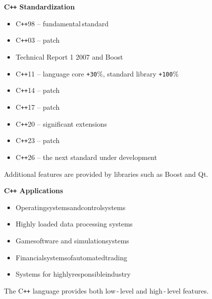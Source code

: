 \documentclass{beamer}
\begin{document}
\begin{frame}{\bf C\texttt{++} Standardization}

    \begin{itemize}

        \item C\texttt{++}98 -- fundamental\,standard

        \item C\texttt{++}03 -- patch

        \item Technical Report 1 2007 and Boost

        \item C\texttt{++}11 -- language core \texttt{+30}\%, standard library \texttt{+100}\%

        \item C\texttt{++}14 -- patch

        \item C\texttt{++}17 -- patch

        \item C\texttt{++}20 -- significant extensions

        \item C\texttt{++}23 -- patch

        \item C\texttt{++}26 -- the next standard under development
         
    \end{itemize}

    \begin{block}
    \justifying Additional features are provided by libraries such as Boost and Qt.
    \end{block}
    
\end{frame}

\begin{frame}{\bf C\texttt{++} Applications}
    
    \begin{itemize}

        \item Operating\:systems\;and\;control\:systems

        \item Highly loaded data processing systems

        \item Game\;software and simulation\;systems

        \item Financial\:systems\:of\:automated\:trading

        \item Systems for highly\;responsible\;industry
        
    \end{itemize}

    \begin{block}
    \justifying The C\texttt{++} language provides both low\,-\,level and high\,-\,level features.
    \end{block}
    
\end{frame}
\end{document}
